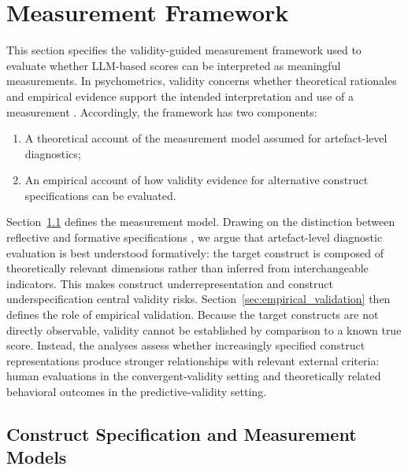 
\section{Measurement Framework}\label{sec:measurement_framework}

This section specifies the validity-guided measurement framework used to evaluate whether LLM-based scores can be interpreted as meaningful measurements. In psychometrics, validity concerns whether theoretical rationales and empirical evidence support the intended interpretation and use of a measurement \citep{messick1989meaning}. Accordingly, the framework has two components: 

\begin{enumerate}
    \item A theoretical account of the measurement model assumed for artefact-level diagnostics;
    \item An empirical account of how validity evidence for alternative construct specifications can be evaluated.
\end{enumerate}



Section~\ref{sec:theoretical_definition} defines the measurement model. Drawing on the distinction between reflective and formative specifications \citep{bollen1991conventional}, we argue that artefact-level diagnostic evaluation is best understood formatively: the target construct is composed of theoretically relevant dimensions rather than inferred from interchangeable indicators. This makes construct underrepresentation and construct underspecification central validity risks. Section~\ref{sec:empirical_validation} then defines the role of empirical validation. Because the target constructs are not directly observable, validity cannot be established by comparison to a known true score. Instead, the analyses assess whether increasingly specified construct representations produce stronger relationships with relevant external criteria: human evaluations in the convergent-validity setting and theoretically related behavioral outcomes in the predictive-validity setting.



\subsection{Construct Specification and Measurement Models}\label{sec:theoretical_definition}

